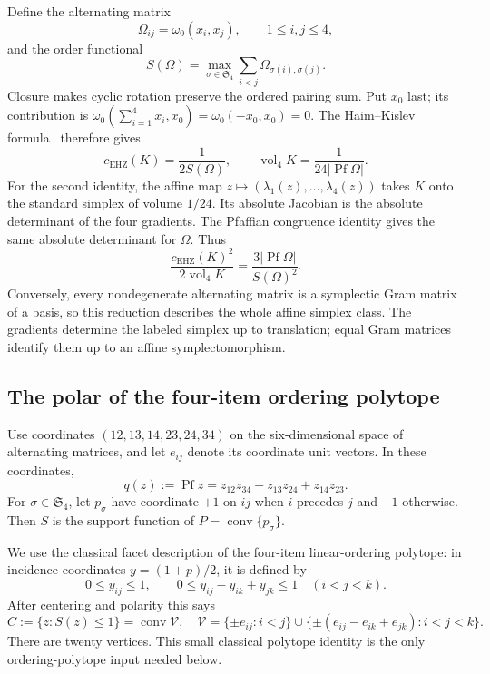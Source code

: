 Define the alternating matrix
\[
 \Omega_{ij}=\omega_0(x_i,x_j),\qquad 1\le i,j\le4,
\]
and the order functional
\begin{equation}\label{eq:simplex-order-functional}
 S(\Omega)=\max_{\sigma\in\mathfrak S_4}
              \sum_{i<j}\Omega_{\sigma(i),\sigma(j)}.
\end{equation}
Closure makes cyclic rotation preserve the ordered pairing sum. Put $x_0$
last; its contribution is
$\omega_0(\sum_{i=1}^4x_i,x_0)=\omega_0(-x_0,x_0)=0$.
The Haim--Kislev formula~\cite[Theorem~1.1]{HK2017} therefore gives
\begin{equation}\label{eq:simplex-capacity-and-volume}
 c_{\mathrm{EHZ}}(K)=\frac1{2S(\Omega)},\qquad
 \operatorname{vol}_4K=\frac1{24|\operatorname{Pf}\Omega|}.
\end{equation}
For the second identity, the affine map
$z\mapsto(\lambda_1(z),\ldots,\lambda_4(z))$ takes $K$ onto the standard
simplex of volume $1/24$. Its absolute Jacobian is the absolute determinant
of the four gradients. The Pfaffian congruence identity gives the same
absolute determinant for $\Omega$. Thus
\begin{equation}\label{eq:simplex-ratio-pfaffian}
 \frac{c_{\mathrm{EHZ}}(K)^2}{2\operatorname{vol}_4K}
 =\frac{3|\operatorname{Pf}\Omega|}{S(\Omega)^2}.
\end{equation}
Conversely, every nondegenerate alternating matrix is a symplectic Gram
matrix of a basis, so this reduction describes the whole affine simplex
class. The gradients determine the labeled simplex up to translation;
equal Gram matrices identify them up to an affine symplectomorphism.

\subsection{The polar of the four-item ordering polytope}

Use coordinates $(12,13,14,23,24,34)$ on the six-dimensional space of
alternating matrices, and let $e_{ij}$ denote its coordinate unit vectors.
In these coordinates,
\[
 q(z):=\operatorname{Pf}z=z_{12}z_{34}-z_{13}z_{24}+z_{14}z_{23}.
\]
For $\sigma\in\mathfrak S_4$, let $p_\sigma$ have coordinate $+1$ on
$ij$ when $i$ precedes $j$ and $-1$ otherwise. Then $S$ is the support
function of $P=\operatorname{conv}\{p_\sigma\}$.

We use the classical facet description of the four-item linear-ordering
polytope: in incidence coordinates $y=(1+p)/2$, it is defined by
\[
 0\le y_{ij}\le1,\qquad
 0\le y_{ij}-y_{ik}+y_{jk}\le1\quad(i<j<k).
\]
After centering and polarity this says
\begin{equation}\label{eq:simplex-order-polar}
 C:=\{z:S(z)\le1\}=\operatorname{conv}\mathcal V,
 \quad
 \mathcal V=\{\pm e_{ij}:i<j\}\cup
 \{\pm(e_{ij}-e_{ik}+e_{jk}):i<j<k\}.
\end{equation}
There are twenty vertices. This small classical polytope identity is the
only ordering-polytope input needed below.

